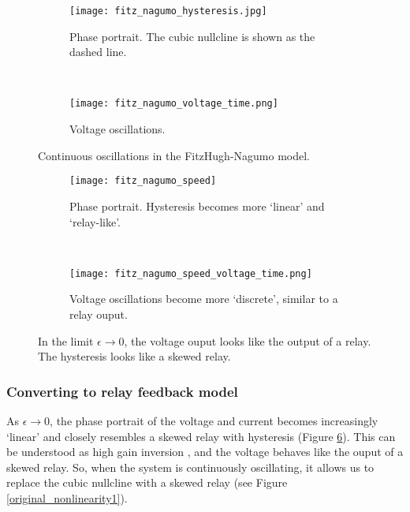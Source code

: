 \documentclass[a4paper, 12pt]{article}
\begin{document}
\begin{figure}
\centering
    \begin{subfigure}[b]{0.45\textwidth}
        \texttt{[image: fitz\_nagumo\_hysteresis.jpg]}
        \caption{Phase portrait. The cubic nullcline is shown as the dashed line.}
        \label{fig:FN_intro_hysteresis}
    \end{subfigure}
    ~ %
    \begin{subfigure}[b]{0.45\textwidth}
        \texttt{[image: fitz\_nagumo\_voltage\_time.png]}
        \caption{Voltage oscillations.}
        \label{fig:FN_intro_voltage}
    \end{subfigure}
    \caption{Continuous oscillations in the FitzHugh-Nagumo model.}
    \label{fig:FN_intro}
\end{figure}

\begin{figure}
\centering
    \begin{subfigure}[b]{0.45\textwidth}
        \texttt{[image: fitz\_nagumo\_speed]}
        \caption{Phase portrait. Hysteresis becomes more `linear' and `relay-like'.}
        \label{fig:FN_eps_hysteresis}
    \end{subfigure}
    ~ %
    \begin{subfigure}[b]{0.45\textwidth}
        \texttt{[image: fitz\_nagumo\_speed\_voltage\_time.png]}
        \caption{Voltage oscillations become more `discrete', similar to a relay ouput.}
        \label{fig:FN_eps_voltage}
    \end{subfigure}
    \caption{In the limit $\epsilon\rightarrow0$, the voltage ouput looks like the output of a relay. The hysteresis looks like a skewed relay. }
    \label{fig:FN_eps_zero}
\end{figure}

\subsubsection{Converting to relay feedback model}\label{sec:FN_to_relay}

As $\epsilon\rightarrow 0$, the phase portrait of the voltage and current becomes increasingly `linear' and closely resembles a skewed relay with hysteresis (Figure \ref{fig:FN_eps_zero}). This can be understood as high gain inversion \cite{goodwin}, and the voltage behaves like the ouput of a skewed relay. So, when the system is continuously oscillating, it allows us to replace the cubic nullcline with a skewed relay (see Figure \ref{original_nonlinearity1}). 
\end{document}
